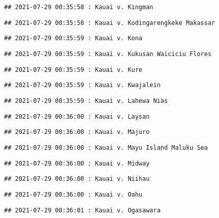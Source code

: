 \documentclass[
]{article}
\begin{document}
\begin{verbatim}
## 2021-07-29 00:35:58 : Kauai v. Kingman
\end{verbatim}

\begin{verbatim}
## 2021-07-29 00:35:58 : Kauai v. Kodingarengkeke Makassar
\end{verbatim}

\begin{verbatim}
## 2021-07-29 00:35:59 : Kauai v. Kona
\end{verbatim}

\begin{verbatim}
## 2021-07-29 00:35:59 : Kauai v. Kukusan Waiciciu Flores
\end{verbatim}

\begin{verbatim}
## 2021-07-29 00:35:59 : Kauai v. Kure
\end{verbatim}

\begin{verbatim}
## 2021-07-29 00:35:59 : Kauai v. Kwajalein
\end{verbatim}

\begin{verbatim}
## 2021-07-29 00:35:59 : Kauai v. Lahewa Nias
\end{verbatim}

\begin{verbatim}
## 2021-07-29 00:36:00 : Kauai v. Laysan
\end{verbatim}

\begin{verbatim}
## 2021-07-29 00:36:00 : Kauai v. Majuro
\end{verbatim}

\begin{verbatim}
## 2021-07-29 00:36:00 : Kauai v. Mayu Island Maluku Sea
\end{verbatim}

\begin{verbatim}
## 2021-07-29 00:36:00 : Kauai v. Midway
\end{verbatim}

\begin{verbatim}
## 2021-07-29 00:36:00 : Kauai v. Niihau
\end{verbatim}

\begin{verbatim}
## 2021-07-29 00:36:00 : Kauai v. Oahu
\end{verbatim}

\begin{verbatim}
## 2021-07-29 00:36:01 : Kauai v. Ogasawara
\end{verbatim}
\end{document}
